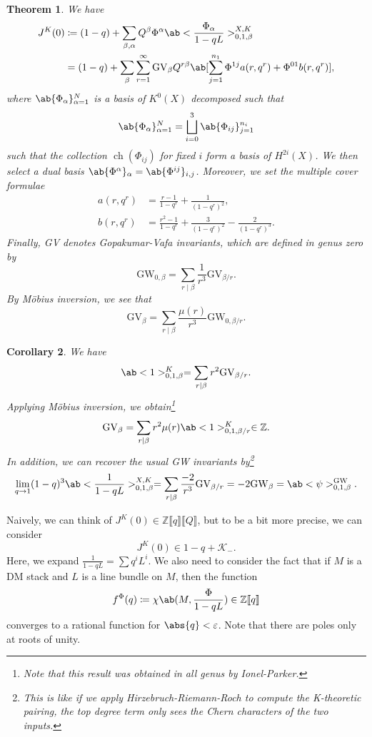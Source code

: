 \documentclass{amsart}
\newtheorem{thm}{Theorem}[section]
\newtheorem{cor}[thm]{Corollary}
\theoremstyle{definition}
\theoremstyle{remark}
\theoremstyle{plain}
\theoremstyle{definition}
\theoremstyle{remark}
\newcommand{\Z}{\mathbb{Z}}
\newcommand{\ep}{\varepsilon}
\newcommand{\mc}[1]{\mathcal{#1}}
\newcommand{\mr}[1]{\mathrm{#1}}
\newcommand{\1}{\mathbf{1}}
\newcommand{\2}{\mathbf{2}}
\newcommand{\3}{\mathbf{3}}
\newcommand{\ps}[1]{\llbracket #1 \rrbracket}
\DeclareMathOperator{\ch}{ch}
\begin{document}
\begin{thm}
    We have
    \begin{align*}
        J^K(0) &\coloneqq (1-q) + \sum_{\beta, \alpha} Q^{\beta} \Phi^{\alpha} \ab<\frac{\Phi_{\alpha}}{1-qL}>_{0,1,\beta}^{X,K} \\
        &= (1-q) + \sum_{\beta} \sum_{r=1}^{\infty} \mr{GV}_{\beta} Q^{r\beta} \ab[\sum_{j=1}^{n_1} \Phi^{1j} a(r, q^r) + \Phi^{01} b(r, q^r)],
    \end{align*}
    where \(\ab\{\Phi_{\alpha}\}_{\alpha=1}^N\) is a basis of \(K^0(X)\) decomposed such that
    \[ \ab\{\Phi_{\alpha}\}_{\alpha=1}^N = \bigsqcup_{i=0}^3 \ab\{\Phi_{ij}\}_{j=1}^{n_i} \]
    such that the collection \(\ch(\Phi_{ij})\) for fixed \(i\) form a basis of \(H^{2i}(X)\). We then select a dual basis \(\ab\{\Phi^{\alpha}\}_{\alpha} = \ab\{\Phi^{ij}\}_{i,j}\). Moreover, we set the multiple cover formulae
    \begin{align*}
        a(r, q^r) &= \frac{r-1}{1-q^r} + \frac{1}{(1-q^r)^2}, \\
        b(r, q^r) &= \frac{r^2-1}{1-q^r} + \frac{3}{(1-q^r)^2} - \frac{2}{(1-q^r)^3}.
    \end{align*}
    Finally, GV denotes Gopakumar-Vafa invariants, which are defined in genus zero by
    \[ \mr{GW}_{0,\beta} = \sum_{r \mid \beta} \frac{1}{r^3} \mr{GV}_{\beta/r}. \]
    By M\"obius inversion, we see that
    \[ \mr{GV}_{\beta} = \sum_{r \mid \beta} \frac{\mu(r)}{r^3} \mr{GW}_{0,\beta/r}. \]
\end{thm}

\begin{cor}
    We have
    \[ \ab<1>_{0,1,\beta}^K = \sum_{r \mid \beta} r^2 \mr{GV}_{\beta/r}. \]
    Applying M\"obius inversion, we obtain\footnote{Note that this result was obtained in all genus by Ionel-Parker.}
    \[ \mr{GV}_{\beta} = \sum_{r \mid \beta} r^2 \mu(r) \ab<1>_{0,1,\beta/r}^K \in \Z. \]
    In addition, we can recover the usual GW invariants by\footnote{This is like if we apply Hirzebruch-Riemann-Roch to compute the K-theoretic pairing, the top degree term only sees the Chern characters of the two inputs.}
    \[ \lim_{q \to 1} (1-q)^3 \ab<\frac{1}{1-qL}>_{0,1,\beta}^{X,K} = \sum_{r \mid \beta} \frac{-2}{r^3} \mr{GV}_{\beta/r} = -2 \mr{GW}_{\beta} = \ab<\psi>_{0,1,\beta}^{\mr{GW}}. \]
\end{cor}

Naively, we can think of \(J^K(0) \in \Z\ps{q}\ps{Q}\), but to be a bit more precise, we can consider
\[ J^K(0) \in 1-q + \mc{K}_-. \]
Here, we expand \(\frac{1}{1-qL} = \sum q^i L^i\). 
We also need to consider the fact that if \(M\) is a DM stack and \(L\) is a line bundle on \(M\), then the function
\[ f^{\Phi}(q) \coloneqq \chi\ab(M, \frac{\Phi}{1-qL}) \in \Z \ps{q} \]
converges to a rational function for \(\abs{q} < \ep\). Note that there are poles only at roots of unity.
\end{document}
